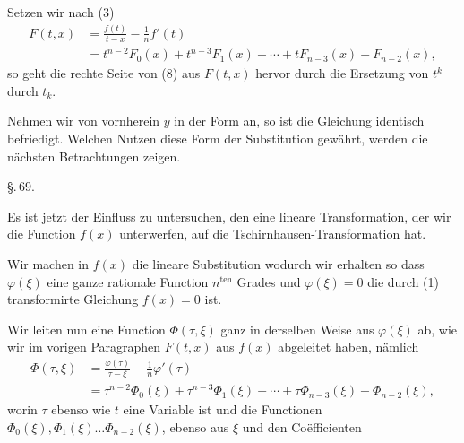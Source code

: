 Setzen wir nach (3)
\begin{align*}
F(t, x) &= \frac{f(t)}{t-x} - \frac{1}{n} f'(t) \tag{11}\\
&= t^{n-2} F_0(x) + t^{n-3} F_1(x) + \cdots + t F_{n-3}(x) + F_{n-2}(x),
\end{align*}
so geht die rechte Seite von (8) aus $F(t, x)$ hervor durch die
Ersetzung von $t^k$ durch $t_k$.

Nehmen wir von vornherein $y$ in der Form
an, so ist die Gleichung
identisch befriedigt. Welchen Nutzen diese Form der Substitution
gew\"ahrt, werden die n\"achsten Betrachtungen zeigen.

\begin{center}
\S.\,69.

\end{center}

Es ist jetzt der Einfluss zu untersuchen, den eine lineare
Transformation, der wir die Function $f(x)$ unterwerfen, auf die
Tschirnhausen-Transformation hat.

Wir machen in $f(x)$ die lineare Substitution
wodurch wir erhalten
so dass $\varphi(\xi)$ eine ganze rationale Function $n^{\text{ten}}$ Grades und
$\varphi(\xi) = 0$ die durch (1) transformirte Gleichung $f(x) = 0$ ist.

Wir leiten nun eine Function $\Phi(\tau, \xi)$ ganz in derselben
Weise aus $\varphi(\xi)$ ab, wie wir im vorigen Paragraphen $F(t, x)$ aus
$f(x)$ abgeleitet haben, n\"amlich
\begin{align*}
\Phi(\tau, \xi) &= \frac{\varphi(\tau)}{\tau - \xi} - \frac{1}{n} \varphi'(\tau) \tag{3}\\
&= \tau^{n-2} \Phi_0(\xi) + \tau^{n-3} \Phi_1(\xi) + \cdots + \tau \Phi_{n-3}(\xi) + \Phi_{n-2}(\xi),
\end{align*}
worin $\tau$ ebenso wie $t$ eine Variable ist und die Functionen
$\Phi_0(\xi), \Phi_1(\xi) \ldots \Phi_{n-2}(\xi)$, ebenso aus $\xi$ und den Co\"efficienten
